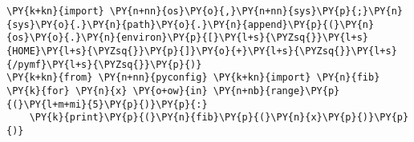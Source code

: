 \begin{Verbatim}[commandchars=\\\{\}]
\PY{k+kn}{import} \PY{n+nn}{os}\PY{o}{,}\PY{n+nn}{sys}\PY{p}{;}\PY{n}{sys}\PY{o}{.}\PY{n}{path}\PY{o}{.}\PY{n}{append}\PY{p}{(}\PY{n}{os}\PY{o}{.}\PY{n}{environ}\PY{p}{[}\PY{l+s}{\PYZsq{}}\PY{l+s}{HOME}\PY{l+s}{\PYZsq{}}\PY{p}{]}\PY{o}{+}\PY{l+s}{\PYZsq{}}\PY{l+s}{/pymf}\PY{l+s}{\PYZsq{}}\PY{p}{)}
\PY{k+kn}{from} \PY{n+nn}{pyconfig} \PY{k+kn}{import} \PY{n}{fib}
\PY{k}{for} \PY{n}{x} \PY{o+ow}{in} \PY{n+nb}{range}\PY{p}{(}\PY{l+m+mi}{5}\PY{p}{)}\PY{p}{:}
    \PY{k}{print}\PY{p}{(}\PY{n}{fib}\PY{p}{(}\PY{n}{x}\PY{p}{)}\PY{p}{)}
\end{Verbatim}
